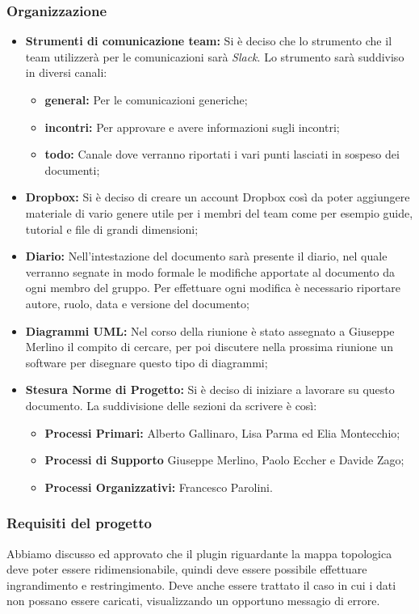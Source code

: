 \documentclass[a4paper, oneside, openany]{article}
\begin{document}
    \subsubsection{Organizzazione}
    \begin{itemize}
	\item { \textbf{Strumenti di comunicazione team:} Si è deciso che lo strumento che il team utilizzerà per le comunicazioni sarà \textit{Slack}. Lo strumento sarà suddiviso in diversi canali:	
		\begin{itemize}
			\item { \textbf{general:} Per le comunicazioni generiche;}
			\item { \textbf{incontri:} Per approvare e avere informazioni sugli incontri;}
			\item { \textbf{todo:} Canale dove verranno riportati i vari punti lasciati in sospeso dei documenti;}
		\end{itemize}
		}
	\item { \textbf{Dropbox:} Si è deciso di creare un account Dropbox così da poter aggiungere materiale di vario genere utile per i membri del team come per esempio guide, tutorial e file di grandi dimensioni;}
	\item { \textbf{Diario:} Nell'intestazione del documento sarà presente il diario, nel quale verranno segnate in modo formale le modifiche apportate al documento da ogni membro del gruppo.
	Per effettuare ogni modifica è necessario riportare autore, ruolo, data e versione del documento;}
	\item { \textbf{Diagrammi UML:} Nel corso della riunione è stato assegnato a Giuseppe Merlino il compito di cercare, per poi discutere nella prossima riunione un software per disegnare questo tipo di diagrammi;}
	\item { \textbf{Stesura Norme di Progetto:} Si è deciso di iniziare a lavorare su questo documento. La suddivisione delle sezioni da scrivere è così: }
		\begin{itemize}
			\item { \textbf{Processi Primari:} Alberto Gallinaro, Lisa Parma ed Elia Montecchio;}
			\item { \textbf{Processi di Supporto} Giuseppe Merlino, Paolo Eccher e Davide Zago;}
			\item { \textbf{Processi Organizzativi:} Francesco Parolini.}
		\end{itemize}
	\end{itemize}
 
	 \subsubsection{Requisiti del progetto}
	Abbiamo discusso ed approvato che il plugin riguardante la mappa topologica deve poter essere ridimensionabile, quindi deve essere possibile effettuare ingrandimento e restringimento. Deve anche essere trattato il caso in cui i dati non possano essere caricati, visualizzando un opportuno messagio di errore.
	
\end{document}
